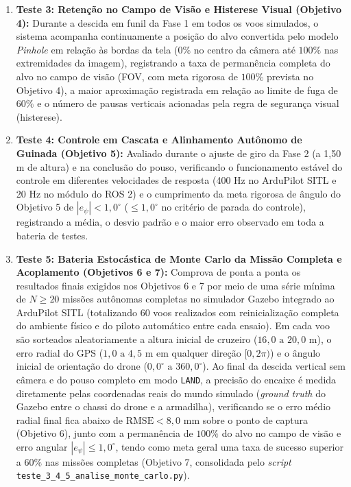 \begin{enumerate}
	\item \textbf{Teste 3: Retenção no Campo de Visão e Histerese Visual (Objetivo 4):} Durante a descida em funil da Fase 1 em todos os voos simulados, o sistema acompanha continuamente a posição do alvo convertida pelo modelo \textit{Pinhole} em relação às bordas da tela ($0\%$ no centro da câmera até $100\%$ nas extremidades da imagem), registrando a taxa de permanência completa do alvo no campo de visão (FOV, com meta rigorosa de $100\%$ prevista no Objetivo 4), a maior aproximação registrada em relação ao limite de fuga de $60\%$ e o número de pausas verticais acionadas pela regra de segurança visual (histerese).
	
	\item \textbf{Teste 4: Controle em Cascata e Alinhamento Autônomo de Guinada (Objetivo 5):} Avaliado durante o ajuste de giro da Fase 2 (a 1,50 m de altura) e na conclusão do pouso, verificando o funcionamento estável do controle em diferentes velocidades de resposta (400 Hz no ArduPilot SITL e 20 Hz no módulo do ROS 2) e o cumprimento da meta rigorosa de ângulo do Objetivo 5 de $|e_\psi| < 1{,}0^\circ$ ($\le 1{,}0^\circ$ no critério de parada do controle), registrando a média, o desvio padrão e o maior erro observado em toda a bateria de testes.
	
	\item \textbf{Teste 5: Bateria Estocástica de Monte Carlo da Missão Completa e Acoplamento (Objetivos 6 e 7):} Comprova de ponta a ponta os resultados finais exigidos nos Objetivos 6 e 7 por meio de uma série mínima de $N \ge 20$ missões autônomas completas no simulador Gazebo integrado ao ArduPilot SITL (totalizando 60 voos realizados com reinicialização completa do ambiente físico e do piloto automático entre cada ensaio). Em cada voo são sorteados aleatoriamente a altura inicial de cruzeiro ($16{,}0\text{ a } 20{,}0\text{ m}$), o erro radial do GPS ($1{,}0\text{ a } 4{,}5\text{ m}$ em qualquer direção $[0, 2\pi)$) e o ângulo inicial de orientação do drone ($0{,}0^\circ\text{ a } 360{,}0^\circ$). Ao final da descida vertical sem câmera e do pouso completo em modo \texttt{LAND}, a precisão do encaixe é medida diretamente pelas coordenadas reais do mundo simulado (\textit{ground truth} do Gazebo entre o chassi do drone e a armadilha), verificando se o erro médio radial final fica abaixo de $\text{RMSE} < 8{,}0\text{ mm}$ sobre o ponto de captura (Objetivo 6), junto com a permanência de $100\%$ do alvo no campo de visão e erro angular $|e_\psi| \le 1{,}0^\circ$, tendo como meta geral uma taxa de sucesso superior a $60\%$ nas missões completas (Objetivo 7, consolidada pelo \textit{script} \texttt{teste\_3\_4\_5\_\allowbreak analise\_\allowbreak monte\_\allowbreak carlo.py}).
\end{enumerate}


